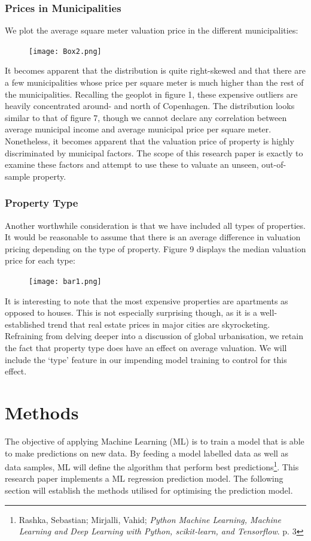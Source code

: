\documentclass[12pt,a4paper]{article}
\begin{document}
\subsubsection{Prices in Municipalities}
We plot the average square meter valuation price in the different municipalities:
\begin{figure}[H]
  \centering
   \caption{}
   \texttt{[image: Box2.png]} 
  \label{fig:}
\end{figure}
It becomes apparent that the distribution is quite right-skewed and that there are a few municipalities whose price per square meter is much higher than the rest of the municipalities. Recalling the geoplot in figure 1, these expensive outliers are heavily concentrated around- and north of Copenhagen. 
The distribution looks similar to that of figure 7, though we cannot declare any correlation between average municipal income and average municipal price per square meter. Nonetheless, it becomes apparent that the valuation price of property is highly discriminated by municipal factors. The scope of this research paper is exactly to examine these factors and attempt to use these to valuate an unseen, out-of-sample property. 

\subsubsection{Property Type}
Another worthwhile consideration is that we have included all types of properties. It would be reasonable to assume that there is an average difference in valuation pricing depending on the type of property. Figure 9 displays the median valuation price for each type:
\begin{figure}[H]
  \centering
   \caption{}
   \texttt{[image: bar1.png]} 
  \label{fig:}
\end{figure}
It is interesting to note that the most expensive properties are apartments as opposed to houses. This is not especially surprising though, as it is a well-established trend that real estate prices in major cities are skyrocketing. Refraining from delving deeper into a discussion of global urbanisation, we retain the fact that property type does have an effect on average valuation. We will include the ‘type’ feature in our impending model training to control for this effect. 


\section{Methods}
The objective of applying Machine Learning (ML) is to train a model that is able to make predictions on new data. By feeding a model labelled data as well as data samples, ML will define the algorithm that perform best predictions\footnote{Rashka, Sebastian; Mirjalli, Vahid; \textit{Python Machine Learning, Machine Learning and Deep Learning with Python, scikit-learn, and Tensorflow}. p. 3}. This research paper implements a ML regression prediction model. The following section will establish the methods utilised for optimising the prediction model. 
\end{document}
